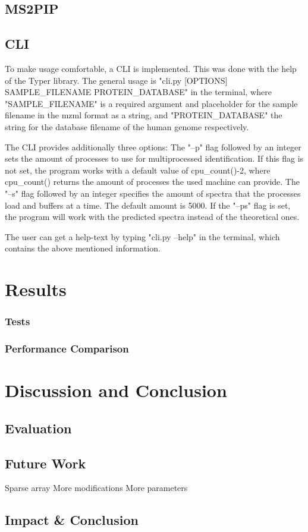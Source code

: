 \documentclass[11pt]{article}
\begin{document}
\subsection{MS2PIP}



\subsection{CLI}
To make usage comfortable, a CLI is implemented. This was done with the help of the Typer library. The general usage is "cli.py [OPTIONS] SAMPLE\_FILENAME PROTEIN\_DATABASE" in the terminal, where "SAMPLE\_FILENAME" is a required argument and placeholder for the sample filename in the mzml format as a string, and "PROTEIN\_DATABASE" the string for the database filename of the human genome respectively. 

The CLI provides additionally three options: The "--p" flag followed by an integer sets the amount of processes to use for multiprocessed identification. If this flag is not set, the program works with a default value of cpu\_count()-2, where cpu\_count() returns the amount of processes the used machine can provide. The "--s" flag followed by an integer specifies the amount of spectra that the processes load and buffers at a time. The default amount is 5000. If the "--ps" flag is set, the program will work with the predicted spectra instead of the theoretical ones.

The user can get a help-text by typing "cli.py --help" in the terminal, which contains the above mentioned information.


\section{Results}
\subsubsection{Tests}
\subsubsection{Performance Comparison}
\section{Discussion and Conclusion}
\subsection{Evaluation}
\subsection{Future Work}
Sparse array
More modifications
More parameters
\subsection{Impact \& Conclusion}


\printbibliography
\end{document}
